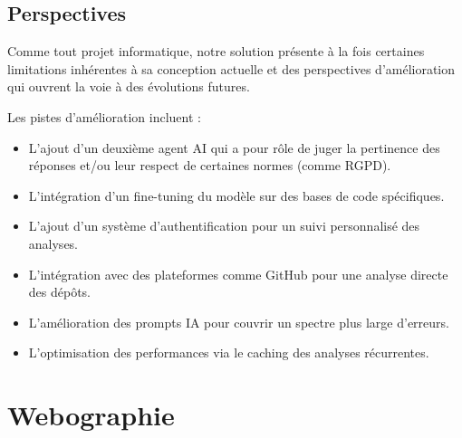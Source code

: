 \documentclass[12pt,a4paper]{report}
\begin{document}
	\section*{Perspectives}
	
	Comme tout projet informatique, notre solution présente à la fois certaines limitations inhérentes à sa conception actuelle et des perspectives d'amélioration qui ouvrent la voie à des évolutions futures.
	
	Les pistes d'amélioration incluent :
	
	\begin{itemize}
		
		\item L'ajout d'un deuxième agent AI qui a pour rôle de juger la pertinence des réponses et/ou leur respect de certaines normes (comme RGPD).
		
		\item L’intégration d’un fine-tuning du modèle sur des bases de code spécifiques.
		
		\item L'ajout d'un système d'authentification pour un suivi personnalisé des analyses.
		
		\item  L'intégration avec des plateformes comme GitHub pour une analyse directe des dépôts. 
		
		\item L'amélioration des prompts IA pour couvrir un spectre plus large d'erreurs.
	
		\item L'optimisation des performances via le caching des analyses récurrentes.
		
	\end{itemize}
	
	\chapter*{Webographie}
	
\end{document}
